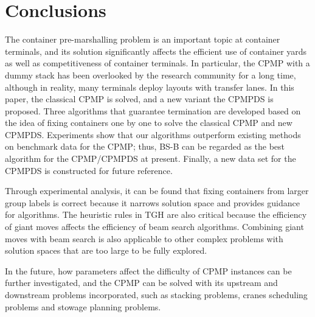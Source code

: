 \documentclass[review,3p,times,authoryear,12pt]{elsarticle}
\begin{document}
\section{Conclusions}
\label{sec:con}

The container pre-marshalling problem is an important topic at container terminals, and its solution significantly affects the efficient use of container yards as well as competitiveness of container terminals.
In particular, the CPMP with a dummy stack has been overlooked by the research community for a long time, although in reality, many terminals deploy layouts with transfer lanes.
In this paper, the classical CPMP is solved, and a new variant the CPMPDS is proposed.
Three algorithms that guarantee termination are developed based on the idea of fixing containers one by one to solve the classical CPMP and new CPMPDS.
Experiments show that our algorithms outperform existing methods on benchmark data for the CPMP; thus, BS-B can be regarded as the best algorithm for the CPMP/CPMPDS at present.
Finally, a new data set for the CPMPDS is constructed for future reference.

Through experimental analysis, it can be found that fixing containers from larger group labels is correct because it narrows solution space and provides guidance for algorithms.
The heuristic rules in TGH are also critical because the efficiency of giant moves affects the efficiency of beam search algorithms.
Combining giant moves with beam search is also applicable to other complex problems with solution spaces that are too large to be fully explored.

In the future, how parameters affect the difficulty of CPMP instances can be further investigated, and the CPMP can be solved with its upstream and downstream problems incorporated, such as stacking problems, cranes scheduling problems and stowage planning problems.






\end{document}
